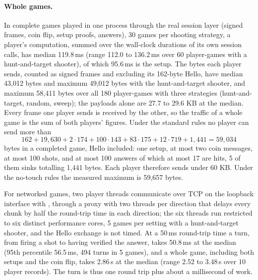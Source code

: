 \documentclass[11pt]{article}
\theoremstyle{definition}
\theoremstyle{remark}
\begin{document}
\paragraph{Whole games.}
In complete games played in one process through the real session layer (signed frames, coin flip, setup proofs, answers), 30 games per shooting strategy, a player's computation, summed over the wall-clock durations of its own session calls, has median 119.8\,ms (range 112.0 to 136.2\,ms over 60 player-games with a hunt-and-target shooter), of which 95.6\,ms is the setup. The bytes each player sends, counted as signed frames and excluding its 162-byte Hello, have median 43,012 bytes and maximum 49,012 bytes with the hunt-and-target shooter, and maximum 58,411 bytes over all 180 player-games with three strategies (hunt-and-target, random, sweep); the payloads alone are 27.7 to 29.6 KB at the median. Every frame one player sends is received by the other, so the traffic of a whole game is the sum of both players' figures. Under the standard rules no player can send more than
\[
  162+19{,}630+2\cdot174+100\cdot143+83\cdot175+12\cdot719+1{,}441=59{,}034
\]
bytes in a completed game, Hello included: one setup, at most two coin messages, at most 100 shots, and at most 100 answers of which at most 17 are hits, 5 of them sinks totalling 1,441 bytes. Each player therefore sends under 60 KB. Under the no-touch rules the measured maximum is 59,657 bytes.

For networked games, two player threads communicate over TCP on the loopback interface with , through a proxy with two threads per direction that delays every chunk by half the round-trip time in each direction; the six threads run restricted to six distinct performance cores, 5 games per setting with a hunt-and-target shooter, and the Hello exchange is not timed. At a 50\,ms round-trip time a turn, from firing a shot to having verified the answer, takes 50.8\,ms at the median (95th percentile 56.5\,ms, 494 turns in 5 games), and a whole game, including both setups and the coin flip, takes 2.86\,s at the median (range 2.52 to 3.48\,s over 10 player records). The turn is thus one round trip plus about a millisecond of work.
\end{document}
